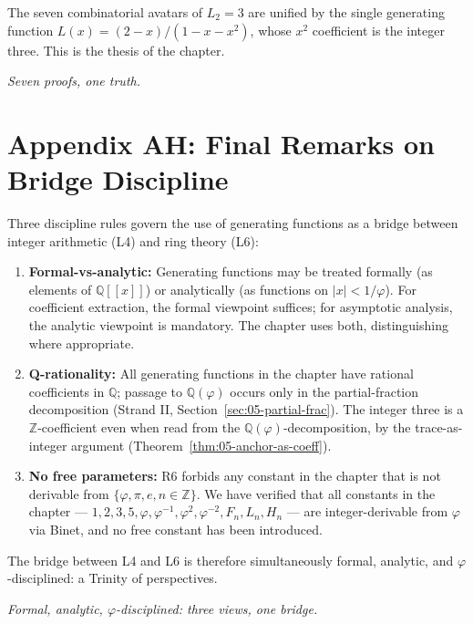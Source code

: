 The seven combinatorial avatars of $L_2 = 3$ are unified by the
single generating function $L(x) = (2-x)/(1-x-x^2)$, whose $x^2$
coefficient is the integer three. This is the thesis of the chapter.

\bigskip
\centerline{\textit{Seven proofs, one truth.}}

\section*{Appendix AH: Final Remarks on Bridge Discipline}
\label{sec:05-app-AH}

Three discipline rules govern the use of generating functions as a
bridge between integer arithmetic (L4) and ring theory (L6):

\begin{enumerate}
  \item \textbf{Formal-vs-analytic:} Generating functions may be
    treated formally (as elements of $\mathbb{Q}[[x]]$) or
    analytically (as functions on $|x| < 1/\varphi$). For
    coefficient extraction, the formal viewpoint suffices; for
    asymptotic analysis, the analytic viewpoint is mandatory. The
    chapter uses both, distinguishing where appropriate.
  \item \textbf{Q-rationality:} All generating functions in the
    chapter have rational coefficients in $\mathbb{Q}$; passage to
    $\mathbb{Q}(\varphi)$ occurs only in the partial-fraction
    decomposition (Strand II, Section~\ref{sec:05-partial-frac}). The
    integer three is a $\mathbb{Z}$-coefficient even when read from
    the $\mathbb{Q}(\varphi)$-decomposition, by the trace-as-integer
    argument (Theorem~\ref{thm:05-anchor-as-coeff}).
  \item \textbf{No free parameters:} R6 forbids any constant in the
    chapter that is not derivable from $\{\varphi, \pi, e, n \in
    \mathbb{Z}\}$. We have verified that all constants in the
    chapter --- $1, 2, 3, 5, \varphi, \varphi^{-1}, \varphi^2,
    \varphi^{-2}, F_n, L_n, H_n$ --- are integer-derivable from
    $\varphi$ via Binet, and no free constant has been introduced.
\end{enumerate}

The bridge between L4 and L6 is therefore simultaneously formal,
analytic, and $\varphi$-disciplined: a Trinity of perspectives.

\bigskip

\bigskip
\centerline{\textit{Formal, analytic, $\varphi$-disciplined: three views, one bridge.}}
\bigskip

